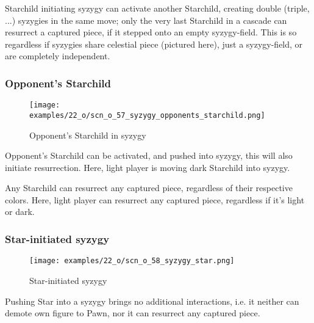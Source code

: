 Starchild initiating syzygy can activate another Starchild, creating double
(triple, ...) syzygies in the same move; only the very last Starchild in a
cascade can resurrect a captured piece, if it stepped onto an empty syzygy-field.
This is so regardless if syzygies share celestial piece (pictured here), just a
syzygy-field, or are completely independent.

\clearpage %

\subsubsection*{Opponent's Starchild}
\label{sec:One/Starchild/Syzygy/Opponent's Starchild}

\vspace*{-1.2\baselineskip}
\noindent
\begin{figure}[!h]
\texttt{[image: examples/22\_o/scn\_o\_57\_syzygy\_opponents\_starchild.png]}
\caption{Opponent's Starchild in syzygy}
\label{fig:scn_o_57_syzygy_opponents_starchild}
\end{figure}

Opponent's Starchild can be activated, and pushed into syzygy, this will also
initiate resurrection. Here, light player is moving dark Starchild into syzygy.

Any Starchild can resurrect any captured piece, regardless of their respective
colors. Here, light player can resurrect any captured piece, regardless if it's
light or dark.

\clearpage %

\subsubsection*{Star-initiated syzygy}
\label{sec:One/Starchild/Syzygy/Star-initiated syzygy}

\vspace*{-1.2\baselineskip}
\noindent
\begin{figure}[!h]
\texttt{[image: examples/22\_o/scn\_o\_58\_syzygy\_star.png]}
\caption{Star-initiated syzygy}
\label{fig:scn_o_58_syzygy_star}
\end{figure}

Pushing Star into a syzygy brings no additional interactions, i.e. it neither can
demote own figure to Pawn, nor it can resurrect any captured piece.

